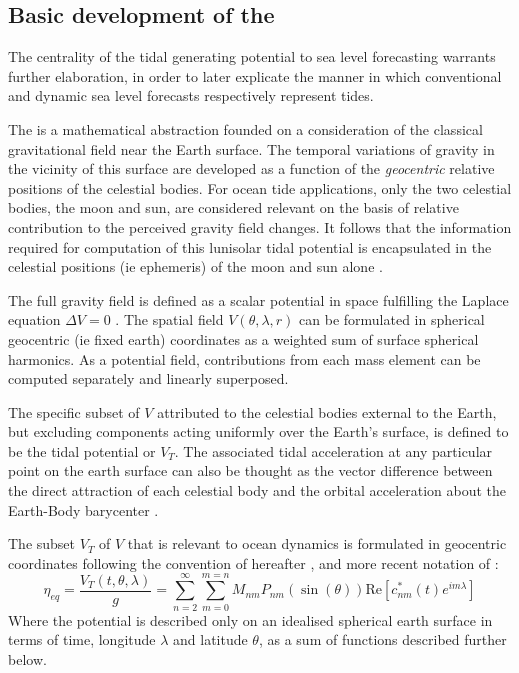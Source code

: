 \subsection{Basic development of the \ATGP{}}  \label{sec:basic_potential}
The centrality of the tidal generating potential to sea level forecasting warrants further elaboration, in order to later explicate the manner in which conventional and dynamic sea level forecasts respectively represent tides. 

The \ATGP{} is a mathematical abstraction founded on a consideration of the classical gravitational field near the Earth surface. The temporal variations of gravity in the vicinity of this surface are developed as a function of the \emph{geocentric} relative positions of the celestial bodies.
For ocean tide applications, only the two celestial bodies, the moon and sun, are considered relevant on the basis of relative contribution to the perceived gravity field changes. It follows that the information required for computation of this lunisolar tidal potential is encapsulated in the celestial positions (ie ephemeris) of the moon and sun alone \citep{10.1016/b978-0-444-53802-4.00058-0}.


The full gravity field is defined as a scalar potential in space fulfilling the Laplace equation $\Delta V=0$ \citep[sec 5.3.1]{Urban:2013vl}.  The spatial field $V(\theta,\lambda,r)$ can be formulated in spherical geocentric (ie fixed earth) coordinates as a weighted sum of surface spherical harmonics. As a potential field, contributions from each mass element can be computed separately and linearly superposed.

The specific subset of $V$ attributed to the celestial bodies external to the Earth, but excluding components acting uniformly over the Earth's surface, is defined to be the tidal potential \ATGP{} or $V_T$.
The associated tidal acceleration at any particular point on the earth surface can also be thought as the vector difference between the direct attraction of each celestial body and the orbital acceleration about the Earth-Body barycenter \citep{Wenzel:1997kn}.


The subset $V_T$ of $V$ that is relevant to ocean dynamics is formulated in geocentric coordinates following the convention of \cite{Cartwright:1973em} hereafter \CTE{}, and more recent notation of \cite{Desai:2006wo}:
\begin{equation}
    \eta_{eq} = \frac{V_T(t,\theta,\lambda) }{g} = \sum_{n=2}^{\infty} \sum_{m=0}^{m=n} M_{nm} P_{nm}( \sin(\theta) ) \text{Re} \left [ c^{*}_{nm}(t) e^{im\lambda} \right ]
    \label{eq:VT}
\end{equation}
Where the potential is described only on an idealised spherical earth surface in terms of time, longitude $\lambda$ and latitude $\theta$, as a sum of functions described further below. 

